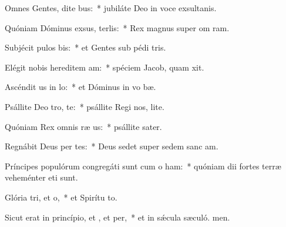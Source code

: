 \item Omnes Gentes, dite bus:~* jubiláte Deo in voce exsultanis.
\item Quóniam Dóminus exsus, terlis:~* Rex magnus super om ram.
\item Subjécit pulos bis:~* et Gentes sub pédi tris.
\item Elégit nobis hereditem am:~* spéciem Jacob, quam xit.
\item Ascéndit us in lo:~* et Dóminus in vo bæ.
\item Psállite Deo tro, te:~* psállite Regi nos, lite.
\item Quóniam Rex omnis ræ us:~* psállite sater.
\item Regnábit Deus per tes:~* Deus sedet super sedem sanc am.
\item Príncipes populórum congregáti sunt cum o ham:~* quóniam dii fortes terræ veheménter eti sunt.
\item Glória tri, et o,~* et Spirítu to.
\item Sicut erat in princípio, et , et per,~* et in sǽcula sæculó. men.
